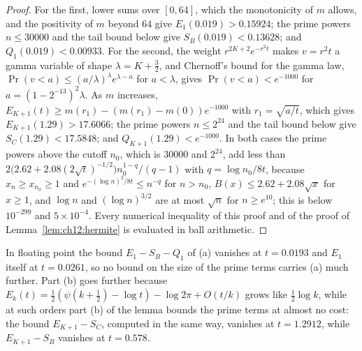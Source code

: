 \begin{proof}
For the first, lower sums over $[0,64]$, which the monotonicity of $m$ allows, and the positivity of $m$ beyond $64$ give $E_1(0.019)>0.15924$; the prime powers $n\le30000$ and the tail bound below give $S_B(0.019)<0.13628$; and $Q_1(0.019)<0.00933$. For the second, the weight $r^{2K+2}e^{-r^2t}$ makes $v=r^2t$ a gamma variable of shape $\lambda=K+\frac32$, and Chernoff's bound for the gamma law, $\Pr(v<a)\le(a/\lambda)^\lambda e^{\lambda-a}$ for $a<\lambda$, gives $\Pr(v<a)<e^{-1000}$ for $a=(1-2^{-13})^2\lambda$. As $m$ increases, $E_{K+1}(t)\ge m(r_1)-(m(r_1)-m(0))e^{-1000}$ with $r_1=\sqrt{a/t}$, which gives $E_{K+1}(1.29)>17.6066$; the prime powers $n\le2^{24}$ and the tail bound below give $S_C(1.29)<17.5848$; and $Q_{K+1}(1.29)<e^{-1000}$. In both cases the prime powers above the cutoff $n_0$, which is $30000$ and $2^{24}$, add less than $2\big(2.62+2.08(2\sqrt t)^{-1/2}\big)n_0^{1-q}/(q-1)$ with $q=\log n_0/8t$, because $x_n\ge x_{n_0}\ge1$ and $e^{-(\log n)^2/8t}\le n^{-q}$ for $n>n_0$, $B(x)\le2.62+2.08\sqrt x$ for $x\ge1$, and $\log n$ and $(\log n)^{3/2}$ are at most $\sqrt n$ for $n\ge e^{10}$; this is below $10^{-299}$ and $5\times10^{-4}$. Every numerical inequality of this proof and of the proof of Lemma~\ref{lem:ch12:hermite} is evaluated in ball arithmetic.
\end{proof}

In floating point the bound $E_1-S_B-Q_1$ of (a) vanishes at $t=0.0193$ and $E_1$ itself at $t=0.0261$, so no bound on the size of the prime terms carries (a) much further. Part (b) goes further because $E_k(t)=\frac12(\psi(k+\frac12)-\log t)-\log2\pi+O(t/k)$ grows like $\frac12\log k$, while at such orders part (b) of the lemma bounds the prime terms at almost no cost: the bound $E_{K+1}-S_C$, computed in the same way, vanishes at $t=1.2912$, while $E_{K+1}-S_B$ vanishes at $t=0.578$.

